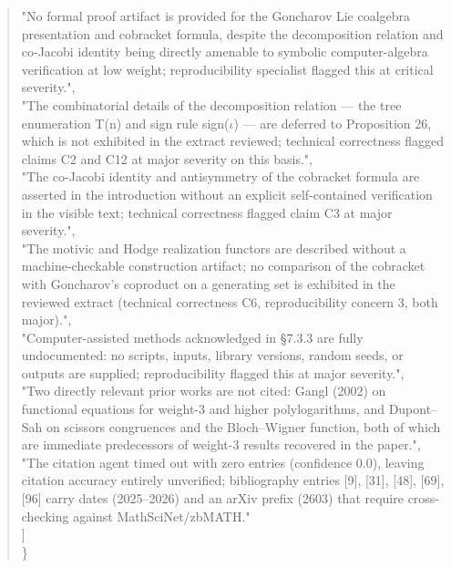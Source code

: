 \documentclass[11pt]{article}
\begin{document}
\begin{quote}
    "No formal proof artifact is provided for the Goncharov Lie coalgebra presentation and cobracket formula, despite the decomposition relation and co-Jacobi identity being directly amenable to symbolic computer-algebra verification at low weight; reproducibility specialist flagged this at critical severity.",\\
    "The combinatorial details of the decomposition relation --- the tree enumeration T(n) and sign rule sign(\ensuremath{\iota}) --- are deferred to Proposition 26, which is not exhibited in the extract reviewed; technical correctness flagged claims C2 and C12 at major severity on this basis.",\\
    "The co-Jacobi identity and antisymmetry of the cobracket formula are asserted in the introduction without an explicit self-contained verification in the visible text; technical correctness flagged claim C3 at major severity.",\\
    "The motivic and Hodge realization functors are described without a machine-checkable construction artifact; no comparison of the cobracket with Goncharov's coproduct on a generating set is exhibited in the reviewed extract (technical correctness C6, reproducibility concern 3, both major).",\\
    "Computer-assisted methods acknowledged in §7.3.3 are fully undocumented: no scripts, inputs, library versions, random seeds, or outputs are supplied; reproducibility flagged this at major severity.",\\
    "Two directly relevant prior works are not cited: Gangl (2002) on functional equations for weight-3 and higher polylogarithms, and Dupont--Sah on scissors congruences and the Bloch--Wigner function, both of which are immediate predecessors of weight-3 results recovered in the paper.",\\
    "The citation agent timed out with zero entries (confidence 0.0), leaving citation accuracy entirely unverified; bibliography entries [9], [31], [48], [69], [96] carry dates (2025--2026) and an arXiv prefix (2603) that require cross-checking against MathSciNet/zbMATH."\\
  ]\\
\}\\
\end{quote}
\end{document}
